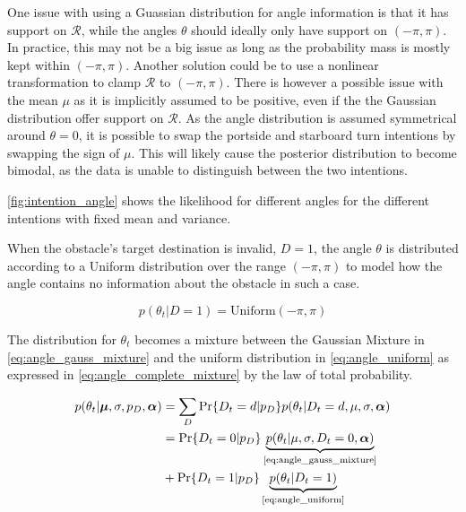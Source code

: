 One issue with using a Guassian distribution for angle information is that it has support on $\mathcal{R}$, while the angles $\theta$ should ideally only have support on $(-\pi, \pi)$. In practice, this may not be a big issue as long as the probability mass is mostly kept within $(-\pi, \pi)$. Another solution could be to use a nonlinear transformation to clamp $\mathcal{R}$ to $(-\pi, \pi)$. There is however a possible issue with the mean $\mu$ as it is implicitly assumed to be positive, even if the the Gaussian distribution offer support on $\mathcal{R}$. As the angle distribution is assumed symmetrical around $\theta=0$, it is possible to swap the portside and starboard turn intentions by swapping the sign of $\mu$. This will likely cause the posterior distribution to become bimodal, as the data is unable to distinguish between the two intentions.  

\cref{fig:intention_angle} shows the likelihood for different angles for the different intentions with fixed mean and variance. 

When the obstacle's target destination is invalid, $D=1$, the angle $\theta$ is distributed according to a Uniform distribution over the range $(-\pi, \pi)$ to model how the angle contains no information about the obstacle in such a case. 

\begin{equation}\label{eq:angle_uniform}
    p(\theta_t | D=1) = \text{Uniform}(-\pi, \pi)
\end{equation}

The distribution for $\theta_t$ becomes a mixture between the Gaussian Mixture in \cref{eq:angle_gauss_mixture} and the uniform distribution in  \cref{eq:angle_uniform} as expressed in \cref{eq:angle_complete_mixture} by the law of total probability.

\begin{align}\label{eq:angle_complete_mixture}
\begin{split}
     p(\theta_t | \boldsymbol{\mu}, \sigma, p_D, \boldsymbol{\alpha})
     &= \sum_D \Pr\{D_t=d | p_D\} p(\theta_t | D_t=d, \mu, \sigma, \boldsymbol{\alpha})\\
     &= \Pr\{D_t = 0 | p_D\} \underbrace{p(\theta_t | \mu, \sigma, D_t=0, \boldsymbol{\alpha})}_{\text{\cref{eq:angle_gauss_mixture}}}\\
     &+ \Pr\{D_t=1 | p_D\}\underbrace{p(\theta_t | D_t=1)}_{\text{\cref{eq:angle_uniform}}}
\end{split}
\end{align}

